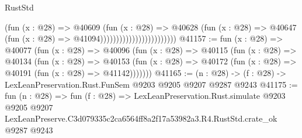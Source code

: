\begin{lexlean}{RustStd}
\begin{coremodule}
                                            (fun (x : @28) =>
                                            @40609
                                              (fun (x : @28) =>
                                              @40628
                                                (fun (x : @28) =>
                                                @40647
                                                  (fun (x : @28) => @41094))))))))))))))))))))))))
@41157 := fun (x : @28) =>
  @40077
    (fun (x : @28) =>
    @40096
      (fun (x : @28) =>
      @40115
        (fun (x : @28) =>
        @40134
          (fun (x : @28) =>
          @40153 (fun (x : @28) => @40172 (fun (x : @28) => @40191 (fun (x : @28) => @41142)))))))
@41165 := (n : @28) -> (f : @28) -> LexLeanPreservation.Rust.FunSem @9203 @9205 @9207 @9287 @9243
@41175 := fun (n : @28) =>
  fun (f : @28) =>
  LexLeanPreservation.Rust.simulate
    @9203
    @9205
    @9207
    LexLeanPreserve.C3d079335c2ca6564ff8a2f17a53982a3.R4.RustStd.crate_ok
    @9287
    @9243
\end{coremodule}
\end{lexlean}
